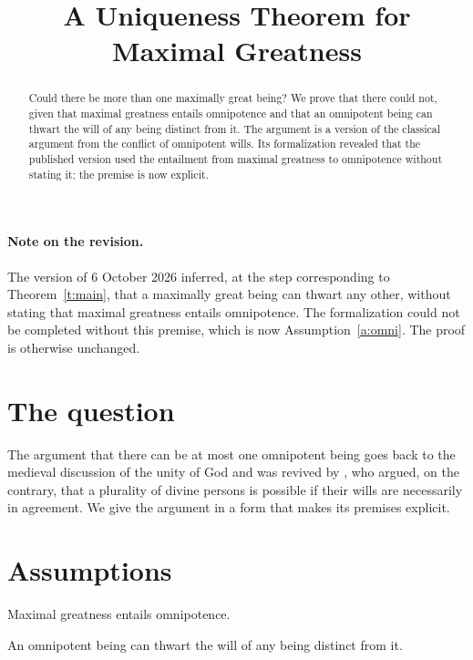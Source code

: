 \documentclass{situationist-preprint}
\title{A Uniqueness Theorem for Maximal Greatness}
\begin{document}
\maketitle

\begin{abstract}
Could there be more than one maximally great being? We prove that there could not, given that maximal greatness entails omnipotence and that an omnipotent being can thwart the will of any being distinct from it. The argument is a version of the classical argument from the conflict of omnipotent wills. Its formalization revealed that the published version used the entailment from maximal greatness to omnipotence without stating it; the premise is now explicit.
\end{abstract}

\paragraph{Note on the revision.} The version of 6 October 2026 inferred, at the step corresponding to Theorem~\ref{t:main}, that a maximally great being can thwart any other, without stating that maximal greatness entails omnipotence. The formalization could not be completed without this premise, which is now Assumption~\ref{a:omni}. The proof is otherwise unchanged.

\section{The question}

The argument that there can be at most one omnipotent being goes back to the medieval discussion of the unity of God \citep[I, q.~11, a.~3]{Aquinas} and was revived by \citet{Swinburne1994}, who argued, on the contrary, that a plurality of divine persons is possible if their wills are necessarily in agreement. We give the argument in a form that makes its premises explicit.

\section{Assumptions}

\begin{assumption}\label{a:omni}
Maximal greatness entails omnipotence.
\end{assumption}

\begin{assumption}\label{a:thwart}
An omnipotent being can thwart the will of any being distinct from it.
\end{assumption}
\end{document}
